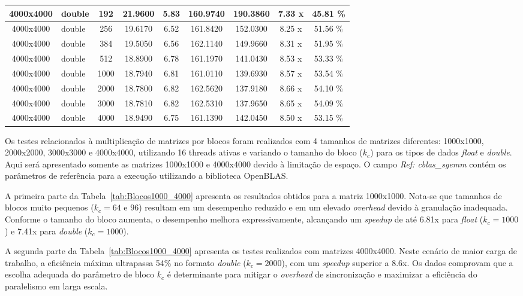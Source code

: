 \documentclass[12pt]{article}
\begin{document}
\begin{table}[H]
\begin{tabular}{|c|l|c|c|c|c|c|c|c|}
        4000x4000 & double & 192  & 21.9600 & 5.83 & 160.9740 & 190.3860 & 7.33 x & 45.81 \% \\ \hline
        4000x4000 & double & 256  & 19.6170 & 6.52 & 161.8420 & 152.0300 & 8.25 x & 51.56 \% \\ \hline
        4000x4000 & double & 384  & 19.5050 & 6.56 & 162.1140 & 149.9660 & 8.31 x & 51.95 \% \\ \hline
        4000x4000 & double & 512  & 18.8900 & 6.78 & 161.1970 & 141.0430 & 8.53 x & 53.33 \% \\ \hline
        4000x4000 & double & 1000 & 18.7940 & 6.81 & 161.0110 & 139.6930 & 8.57 x & 53.54 \% \\ \hline
        4000x4000 & double & 2000 & 18.7800 & 6.82 & 162.5620 & 137.9180 & 8.66 x & 54.10 \% \\ \hline
        4000x4000 & double & 3000 & 18.7810 & 6.82 & 162.5310 & 137.9650 & 8.65 x & 54.09 \% \\ \hline
        4000x4000 & double & 4000 & 18.9490 & 6.75 & 161.1390 & 142.0450 & 8.50 x & 53.15 \% \\ \hline
    \end{tabular}
\end{table}
\normalsize
\FloatBarrier

\par Os testes relacionados à multiplicação de matrizes por blocos foram realizados com 4 tamanhos de matrizes diferentes: 1000x1000, 2000x2000, 3000x3000 e 4000x4000, utilizando 16 threads ativas e variando o tamanho do bloco ($k_c$) para os tipos de dados \textit{float} e \textit{double}. Aqui será apresentado somente as matrizes 1000x1000 e 4000x4000 devido à limitação de espaço. O campo \textit{Ref: cblas\_sgemm} contém os parâmetros de referência para a execução utilizando a biblioteca OpenBLAS.

\par A primeira parte da Tabela~\ref{tab:Blocos1000_4000} apresenta os resultados obtidos para a matriz 1000x1000. Nota-se que tamanhos de blocos muito pequenos ($k_c = 64$ e $96$) resultam em um desempenho reduzido e em um elevado \textit{overhead} devido à granulação inadequada. Conforme o tamanho do bloco aumenta, o desempenho melhora expressivamente, alcançando um \textit{speedup} de até 6.81x para \textit{float} ($k_c = 1000$) e 7.41x para \textit{double} ($k_c = 1000$).

\par \sloppy A segunda parte da Tabela~\ref{tab:Blocos1000_4000} apresenta os testes realizados com matrizes 4000x4000. Neste cenário de maior carga de trabalho, a eficiência máxima ultrapassa 54\% no formato \textit{double} ($k_c = 2000$), com um \textit{speedup} superior a 8.6x. Os dados comprovam que a escolha adequada do parâmetro de bloco $k_c$ é determinante para mitigar o \textit{overhead} de sincronização e maximizar a eficiência do paralelismo em larga escala.
\end{document}
